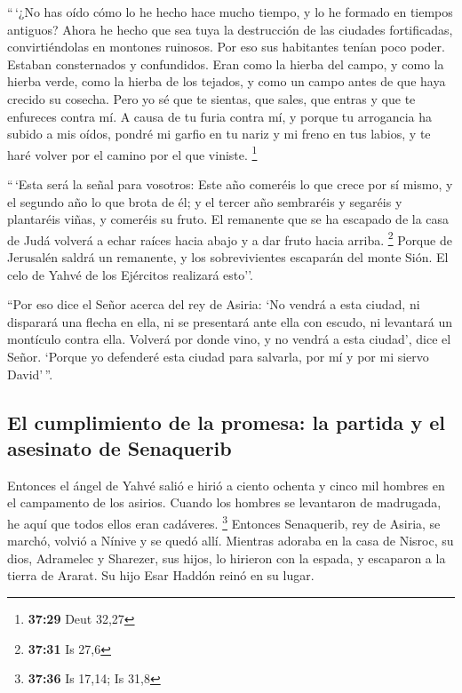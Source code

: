 \begin{paracol}{2}
 ``\,`¿No has oído cómo lo he hecho hace mucho tiempo, y
lo he formado en tiempos antiguos? Ahora he hecho que sea tuya la
destrucción de las ciudades fortificadas, convirtiéndolas en montones
ruinosos.  Por eso sus habitantes tenían poco poder.
Estaban consternados y confundidos. Eran como la hierba del campo, y
como la hierba verde, como la hierba de los tejados, y como un campo
antes de que haya crecido su cosecha.  Pero yo sé que te
sientas, que sales, que entras y que te enfureces contra mí.
 A causa de tu furia contra mí, y porque tu arrogancia ha
subido a mis oídos, pondré mi garfio en tu nariz y mi freno en tus
labios, y te haré volver por el camino por el que viniste. \footnote{\textbf{37:29}
  Deut 32,27}

 ``\,`Esta será la señal para vosotros: Este año comeréis
lo que crece por sí mismo, y el segundo año lo que brota de él; y el
tercer año sembraréis y segaréis y plantaréis viñas, y comeréis su
fruto.  El remanente que se ha escapado de la casa de
Judá volverá a echar raíces hacia abajo y a dar fruto hacia arriba.
\footnote{\textbf{37:31} Is 27,6}  Porque de Jerusalén
saldrá un remanente, y los sobrevivientes escaparán del monte Sión. El
celo de Yahvé de los Ejércitos realizará esto''.

 ``Por eso dice el Señor acerca del rey de Asiria: `No
vendrá a esta ciudad, ni disparará una flecha en ella, ni se presentará
ante ella con escudo, ni levantará un montículo contra ella.
 Volverá por donde vino, y no vendrá a esta ciudad', dice
el Señor.  `Porque yo defenderé esta ciudad para
salvarla, por mí y por mi siervo David'\,''.

\hypertarget{el-cumplimiento-de-la-promesa-la-partida-y-el-asesinato-de-senaquerib}{%
\subsection{El cumplimiento de la promesa: la partida y el asesinato de
Senaquerib}\label{el-cumplimiento-de-la-promesa-la-partida-y-el-asesinato-de-senaquerib}}

 Entonces el ángel de Yahvé salió e hirió a ciento
ochenta y cinco mil hombres en el campamento de los asirios. Cuando los
hombres se levantaron de madrugada, he aquí que todos ellos eran
cadáveres. \footnote{\textbf{37:36} Is 17,14; Is 31,8} 
Entonces Senaquerib, rey de Asiria, se marchó, volvió a Nínive y se
quedó allí.  Mientras adoraba en la casa de Nisroc, su
dios, Adramelec y Sharezer, sus hijos, lo hirieron con la espada, y
escaparon a la tierra de Ararat. Su hijo Esar Haddón reinó en su lugar.


\end{paracol}
